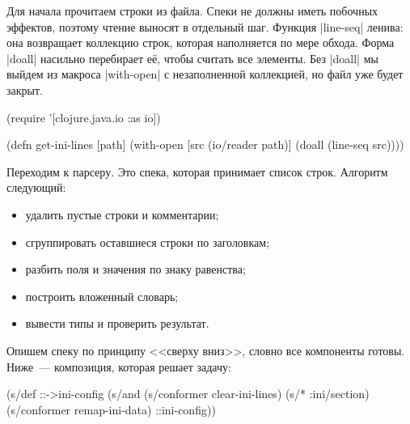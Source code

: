 
Для начала прочитаем строки из файла. Спеки не должны иметь побочных эффектов,
поэтому чтение выносят в отдельный шаг. Функция \spverb|line-seq| ленива: она
возвращает коллекцию строк, которая наполняется по мере обхода. Форма
\spverb|doall| насильно перебирает е\"{е}, чтобы считать все элементы. Без
\spverb|doall| мы выйдем из макроса \spverb|with-open| с незаполненной
коллекцией, но файл уже будет закрыт.



\begin{english}
  \begin{clojure}
(require '[clojure.java.io :as io])

(defn get-ini-lines [path]
  (with-open [src (io/reader path)]
    (doall (line-seq src))))
  \end{clojure}
\end{english}

Переходим к парсеру. Это спека, которая принимает список строк. Алгоритм
следующий:

\begin{itemize}

\item
  удалить пустые строки и комментарии;

\item
  сгруппировать оставшиеся строки по заголовкам;

\item
  разбить поля и значения по знаку равенства;

\item
  построить вложенный словарь;

\item
  вывести типы и проверить результат.

\end{itemize}

Опишем спеку по принципу <<сверху вниз>>, словно все компоненты готовы. Ниже~---
композиция, которая решает задачу:

\begin{english}
  \begin{clojure}
(s/def ::->ini-config
  (s/and
   (s/conformer clear-ini-lines)
   (s/* :ini/section)
   (s/conformer remap-ini-data)
   ::ini-config))
  \end{clojure}
\end{english}

